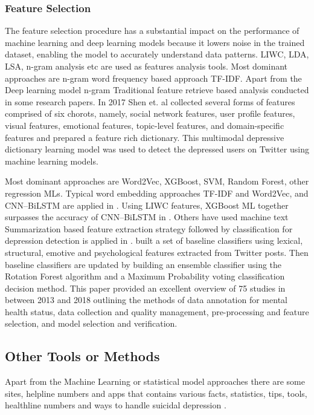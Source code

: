 \documentclass[sn-mathphys,Numbered]{sn-jnl}%
\theoremstyle{thmstyleone}%
\theoremstyle{thmstyletwo}%
\theoremstyle{thmstylethree}%
\begin{document}
\subsubsection{Feature Selection} 
The feature selection procedure has a substantial impact on the performance of machine learning and deep learning models because it lowers noise in the trained dataset, enabling the model to accurately understand data patterns. LIWC, LDA, LSA, n-gram analysis \cite{pennebaker2001linguistic, tadesse2019detection} etc are used as features analysis tools. 
Most dominant approaches are n-gram word frequency based approach TF-IDF. Apart from the Deep learning model n-gram Traditional feature retrieve based analysis conducted in some research papers. In 2017 Shen et. al \cite{harvesting_social_media} collected several forms of features comprised of six chorots, namely, social network features, user profile features, visual features, emotional features, topic-level features, and domain-specific features and prepared a feature rich dictionary. This multimodal depressive dictionary learning model was used to detect the depressed users on Twitter using machine learning models. 

Most dominant approaches are Word2Vec, XGBoost, SVM, Random Forest, other regression MLs. Typical word embedding approaches TF-IDF and Word2Vec, and CNN–BiLSTM are applied in  \cite{aldhyani2022detecting}. Using LIWC features, XGBoost ML together surpasses the accuracy of CNN–BiLSTM in  \cite{aldhyani2022detecting}. Others have used machine text Summarization based feature extraction strategy followed by classification for depression detection is applied in \cite{zogan2021depressionnet}. \cite{burnap2015machine}built a set of baseline classifiers using lexical, structural, emotive and psychological features extracted from Twitter posts. Then baseline classifiers are updated by building an ensemble classifier using the Rotation Forest algorithm and a Maximum Probability voting classification decision method. \cite{chancellor2020methods} This paper provided an excellent overview of 75 studies in between 2013 and 2018 outlining the methods of data annotation for mental health status, data collection and quality management, pre-processing and feature selection, and model selection and verification. 

\subsection{Other Tools or Methods}
Apart from the Machine Learning or statistical model approaches there are some sites, helpline numbers and apps \cite{martinengo2019suicide} that contains various facts, statistics, tips, tools, healthline numbers and ways to handle suicidal depression \cite{suicidaldepression_online}. 
\end{document}
